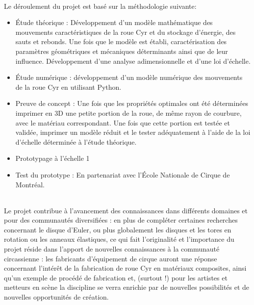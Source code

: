 \\
Le déroulement du projet est basé sur la méthodologie suivante:
\begin{itemize}
\item Étude théorique : Développement d’un modèle mathématique des mouvements caractéristiques de la roue Cyr et du stockage d’énergie, des sauts et rebonds. Une fois que le modèle est établi, caractérisation des paramètres géométriques et mécaniques déterminants ainsi que de leur influence. Développement d’une analyse adimensionnelle et d’une loi d’échelle.
\item Étude numérique : développement d’un modèle numérique des mouvements de la roue Cyr en utilisant Python.
\item Preuve de concept : Une fois que les propriétés optimales ont été déterminées imprimer en 3D une petite portion de la roue, de même rayon de courbure, avec le matériau correspondant. Une fois que cette portion est testée et validée, imprimer un modèle réduit et le tester adéquatement à l’aide de la loi d’échelle déterminée à l’étude théorique.
\item Prototypage à l’échelle 1
\item Test du prototype : En partenariat avec l’École Nationale de Cirque de Montréal.
\end{itemize}
\\
Le projet contribue à l’avancement des connaissances dans différents domaines et pour des communautés diversifiées : en plus de compléter certaines recherches concernant le disque d’Euler, ou plus globalement les disques et les tores en rotation ou les anneaux élastiques, ce qui fait l’originalité et l’importance du projet réside dans l’apport de nouvelles connaissances à la communauté circassienne : les fabricants d’équipement de cirque auront une réponse concernant l’intérêt de la fabrication de roue Cyr en matériaux composites, ainsi qu’un exemple de procédé de fabrication et, (surtout !) pour les artistes et metteurs en scène la discipline se verra enrichie par de nouvelles possibilités et de nouvelles opportunités de création.

